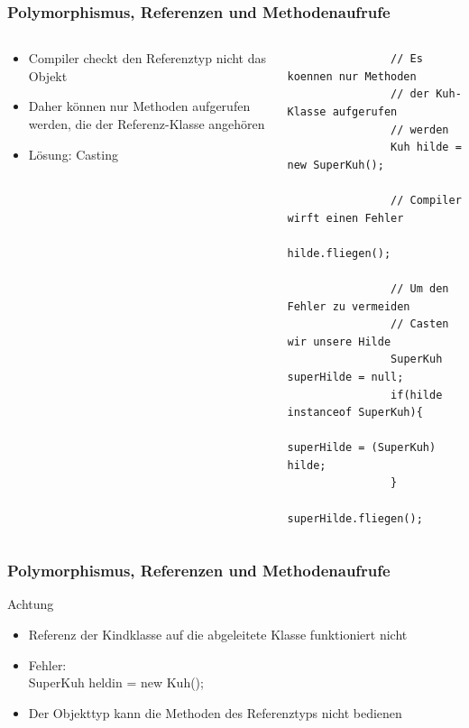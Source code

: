 \begin{frame}[fragile]
	\frametitle{Polymorphismus, Referenzen und Methodenaufrufe}
	\begin{columns}
		\begin{column}{0.5\textwidth}
			\begin{itemize}
			  \item Compiler checkt den Referenztyp
			  nicht das Objekt
			  \item Daher k\"onnen nur Methoden
			  aufgerufen werden, die der Referenz-Klasse
			  angeh\"oren
			  \item L\"osung: Casting
			\end{itemize}
		\end{column}
		\begin{column}{0.5\textwidth}
			\begin{lstlisting}
				// Es koennen nur Methoden
				// der Kuh-Klasse aufgerufen 
				// werden
				Kuh hilde = new SuperKuh();
				
				// Compiler wirft einen Fehler
				hilde.fliegen();
				
				// Um den Fehler zu vermeiden
				// Casten wir unsere Hilde
				SuperKuh superHilde = null;
				if(hilde instanceof SuperKuh){
					superHilde = (SuperKuh) hilde;
				}
				superHilde.fliegen();
			\end{lstlisting}
		\end{column}
	\end{columns}
\end{frame}

\begin{frame}[fragile]
	\frametitle{Polymorphismus, Referenzen und Methodenaufrufe}
		\begin{alertblock}{Achtung}
			\begin{itemize}
			  \item Referenz der Kindklasse auf die abgeleitete Klasse
			  funktioniert nicht
			  \item Fehler:\\
			  SuperKuh heldin = new Kuh();
			  \item Der Objekttyp kann die Methoden des Referenztyps
			  nicht bedienen
			\end{itemize}
		\end{alertblock}  
\end{frame}

